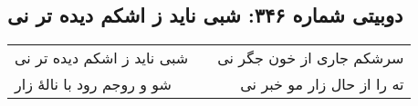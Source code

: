 \begin{center}
\section*{دوبیتی شماره ۳۴۶: شبی ناید ز اشکم دیده تر نی}
\label{sec:346}
\begin{longtable}{l p{0.5cm} r}
شبی ناید ز اشکم دیده تر نی
&&
سرشکم جاری از خون جگر نی
\\
شو و روجم رود با نالهٔ زار
&&
ته را از حال زار مو خبر نی
\\
\end{longtable}
\end{center}
